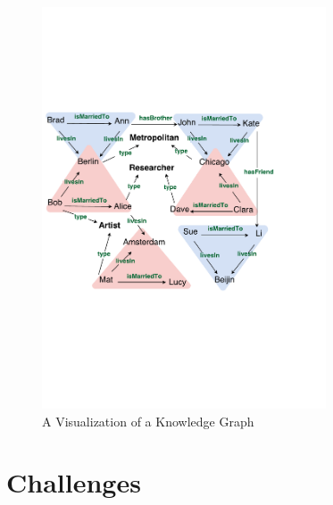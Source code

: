 \begin{figure}[t]
\centering
\includegraphics[width=0.75\textwidth]{figures/kg_advanced_col}
\caption{A Visualization of a Knowledge Graph}
\label{fig1.1}
\end{figure}

\section{Challenges}

